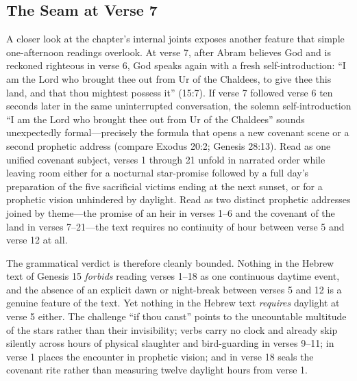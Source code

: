 \subsection{The Seam at Verse 7}

A closer look at the chapter's internal joints exposes another feature that simple one-afternoon readings overlook. At verse 7, after Abram believes God and is reckoned righteous in verse 6, God speaks again with a fresh self-introduction: ``I am the Lord who brought thee out from Ur of the Chaldees, to give thee this land, and that thou mightest possess it'' (15:7). If verse 7 followed verse 6 ten seconds later in the same uninterrupted conversation, the solemn self-introduction ``I am the Lord who brought thee out from Ur of the Chaldees'' sounds unexpectedly formal---precisely the formula that opens a new covenant scene or a second prophetic address (compare Exodus 20:2; Genesis 28:13). Read as one unified covenant subject, verses 1 through 21 unfold in narrated order while leaving room either for a nocturnal star-promise followed by a full day's preparation of the five sacrificial victims ending at the next sunset, or for a prophetic vision unhindered by daylight. Read as two distinct prophetic addresses joined by theme---the promise of an heir in verses 1--6 and the covenant of the land in verses 7--21---the text requires no continuity of hour between verse 5 and verse 12 at all.

The grammatical verdict is therefore cleanly bounded. Nothing in the Hebrew text of Genesis 15 \emph{forbids} reading verses 1--18 as one continuous daytime event, and the absence of an explicit dawn or night-break between verses 5 and 12 is a genuine feature of the text. Yet nothing in the Hebrew text \emph{requires} daylight at verse 5 either. The challenge ``if thou canst'' points to the uncountable multitude of the stars rather than their invisibility;  verbs carry no clock and already skip silently across hours of physical slaughter and bird-guarding in verses 9--11;  in verse 1 places the encounter in prophetic vision; and  in verse 18 seals the covenant rite rather than measuring twelve daylight hours from verse 1.
